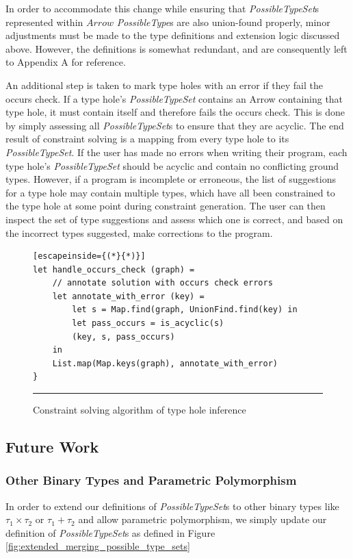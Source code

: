In order to accommodate this change while ensuring that \textit{PossibleTypeSet}s represented within $Arrow$ \textit{PossibleType}s are also union-found properly, minor adjustments must be made to the type definitions and extension logic discussed above. However, the definitions is somewhat redundant, and are consequently left to Appendix A for reference.

An additional step is taken to mark type holes with an error if they fail the occurs check. If a type hole's \textit{PossibleTypeSet} contains an Arrow containing that type hole, it must contain itself and therefore fails the occurs check. This is done by simply assessing all \textit{PossibleTypeSet}s to ensure that they are acyclic. The end result of constraint solving is a mapping from every type hole to its \textit{PossibleTypeSet}. If the user has made no errors when writing their program, each type hole's \textit{PossibleTypeSet} should be acyclic and contain no conflicting ground types. However, if a program is incomplete or erroneous, the list of suggestions for a type hole may contain multiple types, which have all been constrained to the type hole at some point during constraint generation. The user can then inspect the set of type suggestions and assess which one is correct, and based on the incorrect types suggested, make corrections to the program.

\begin{figure}[h!]
\begin{lstlisting}[escapeinside={(*}{*)}]
let handle_occurs_check (graph) =
    // annotate solution with occurs check errors
    let annotate_with_error (key) =
        let s = Map.find(graph, UnionFind.find(key) in
        let pass_occurs = is_acyclic(s)
        (key, s, pass_occurs)
    in
    List.map(Map.keys(graph), annotate_with_error)
}
\end{lstlisting}
\vspace{-4px}
 \hrule
\caption{Constraint solving algorithm of type hole inference}
\label{fig:occurs_check}
\end{figure}

\subsection{Future Work}
\subsubsection{Other Binary Types and Parametric Polymorphism}
In order to extend our definitions of \emph{PossibleTypeSet}s to other binary types like $\tau_1 \times \tau_2$ or $\tau_1 + \tau_2$ and allow parametric polymorphism, we simply update our definition of \emph{PossibleTypeSet}s as defined in Figure \ref{fig:extended_merging_possible_type_sets}

